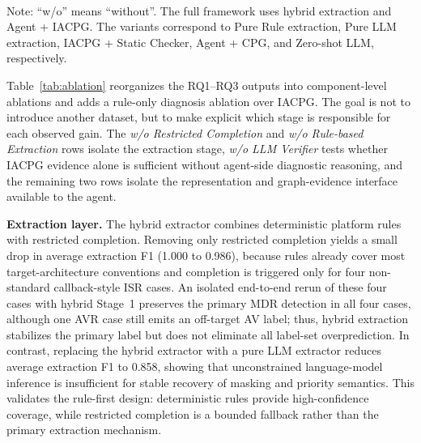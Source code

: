 \documentclass[conference]{IEEEtran}
\begin{document}
\begin{table}[!t]
  \centering
  \caption{Ablation results over extraction, representation, and verifier stages.}
  \label{tab:ablation}
  \setlength{\tabcolsep}{2.4pt}
  \\[4pt]
  \footnotesize{Note: ``w/o'' means ``without''. The full framework uses hybrid extraction and Agent + IACPG. The variants correspond to Pure Rule extraction, Pure LLM extraction, IACPG + Static Checker, Agent + CPG, and Zero-shot LLM, respectively.}
\end{table}

Table~\ref{tab:ablation} reorganizes the RQ1--RQ3 outputs into component-level ablations and adds a rule-only diagnosis ablation over IACPG. The goal is not to introduce another dataset, but to make explicit which stage is responsible for each observed gain. The \textit{w/o Restricted Completion} and \textit{w/o Rule-based Extraction} rows isolate the extraction stage, \textit{w/o LLM Verifier} tests whether IACPG evidence alone is sufficient without agent-side diagnostic reasoning, and the remaining two rows isolate the representation and graph-evidence interface available to the agent.

\textbf{Extraction layer.} The hybrid extractor combines deterministic platform rules with restricted completion. Removing only restricted completion yields a small drop in average extraction F1 (1.000 to 0.986), because rules already cover most target-architecture conventions and completion is triggered only for four non-standard callback-style ISR cases. An isolated end-to-end rerun of these four cases with hybrid Stage~1 preserves the primary MDR detection in all four cases, although one AVR case still emits an off-target AV label; thus, hybrid extraction stabilizes the primary label but does not eliminate all label-set overprediction. In contrast, replacing the hybrid extractor with a pure LLM extractor reduces average extraction F1 to 0.858, showing that unconstrained language-model inference is insufficient for stable recovery of masking and priority semantics. This validates the rule-first design: deterministic rules provide high-confidence coverage, while restricted completion is a bounded fallback rather than the primary extraction mechanism.
\end{document}

